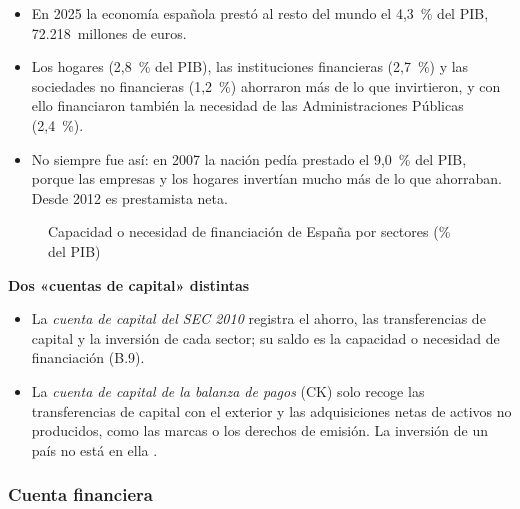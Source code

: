 \documentclass[11pt]{article}
\begin{document}
\begin{itemize}
  \begin{itemize}
  \item En 2025 la economía española prestó al resto del mundo el 4,3~\% del PIB, 72.218~millones de euros\nocite{Eurostat2026nasa10nftr}.
  \item Los hogares (2,8~\% del PIB), las instituciones financieras (2,7~\%) y las sociedades no financieras (1,2~\%) ahorraron más de lo que invirtieron, y con ello financiaron también la necesidad de las Administraciones Públicas (2,4~\%).
  \item No siempre fue así: en 2007 la nación pedía prestado el 9,0~\% del PIB, porque las empresas y los hogares invertían mucho más de lo que ahorraban. Desde 2012 es prestamista neta\nocite{Eurostat2026nasa10nftr}.
  \end{itemize}
\end{itemize}

\begin{figure}[H]
\centering
\caption{Capacidad o necesidad de financiación de España por sectores (\% del PIB)}\label{fig:capacidad-sectores}
\end{figure}

\begin{anotaciones}[unbreakable]
\textbf{Dos «cuentas de capital» distintas}
\begin{itemize}
\item La \emph{cuenta de capital del SEC 2010} registra el ahorro, las transferencias de capital y la inversión de cada sector; su saldo es la capacidad o necesidad de financiación (B.9).
\item La \emph{cuenta de capital de la balanza de pagos} ($\mathrm{CK}$) solo recoge las transferencias de capital con el exterior y las adquisiciones netas de activos no producidos, como las marcas o los derechos de emisión. La inversión de un país no está en ella .
\end{itemize}
\end{anotaciones}

\subsubsection{Cuenta financiera}\label{sec:cuenta-financiera}
\end{document}
